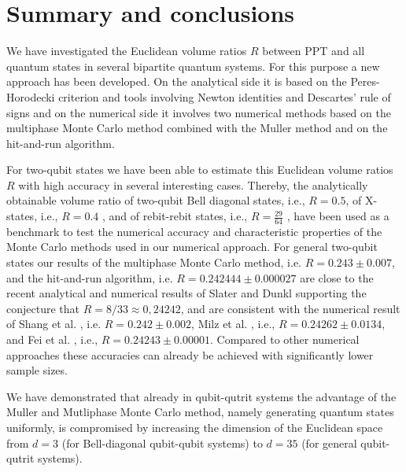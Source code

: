 \documentclass[12pt]{iopart}
\begin{document}
\section{Summary and conclusions}
\label{V}

We have investigated the Euclidean volume ratios $R$ between PPT and all quantum states in several bipartite quantum systems. For this purpose a new approach has been developed. On the analytical side it is based 
on the 
Peres-Horodecki criterion and tools involving Newton identities and Descartes' rule of signs and on the numerical side it involves two numerical 
methods based on the multiphase Monte Carlo method combined with the Muller method and on the hit-and-run algorithm. 
 
For two-qubit states we have been able to estimate this Euclidean volume ratios $R$ with high accuracy in several interesting cases. 
Thereby, the analytically obtainable volume ratio of two-qubit Bell diagonal states, i.e., $R=0.5$, of X-states, i.e., $R=0.4$ \cite{Milz}, and of rebit-rebit states, i.e., $R=\frac{29}{64}$ \cite{Lovas},
have been used as a benchmark to test the numerical accuracy and characteristic properties of the Monte Carlo methods used in our numerical approach. For general two-qubit states our results of the 
multiphase Monte Carlo method, i.e. $R=0.243 \pm 0.007$, and the hit-and-run algorithm, i.e. $R=0.242444 \pm 0.000027$
are close to the recent analytical and numerical results of Slater and Dunkl \cite{Slater3} supporting the conjecture that $R=8/33\approx 0,24242$, and are consistent with the numerical result of 
Shang et al. \cite{Shang}, i.e. $R=0.242 \pm 0.002$, Milz et al. \cite{Milz}, i.e., $R = 0.24262 \pm 0.0134$, and Fei et al. \cite{Fei}, i.e., $R=0.24243 \pm 0.00001$. Compared to other numerical approaches 
these accuracies can already be achieved with  significantly lower sample sizes.


We have demonstrated that already in qubit-qutrit systems  the advantage of the Muller and Mutliphase Monte Carlo method, namely generating quantum states uniformly, is compromised 
by increasing the dimension of the Euclidean space from $d=3$ (for Bell-diagonal qubit-qubit systems) to $d=35$ (for general qubit-qutrit systems).
\end{document}
